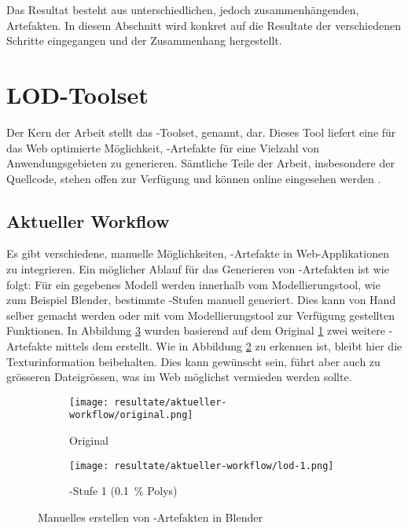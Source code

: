 Das Resultat besteht aus unterschiedlichen, jedoch zusammenhängenden, Artefakten. In diesem Abschnitt wird konkret auf die Resultate der verschiedenen Schritte eingegangen und der Zusammenhang hergestellt.

\section{LOD-Toolset}

Der Kern der Arbeit stellt das -Toolset,  genannt, dar. Dieses Tool liefert eine für das Web optimierte Möglichkeit, -Artefakte für eine Vielzahl von Anwendungsgebieten zu generieren. Sämtliche Teile der Arbeit, insbesondere der Quellcode, stehen offen zur Verfügung und können online eingesehen werden \cite{lode}.

\subsection{Aktueller Workflow}

Es gibt verschiedene, manuelle Möglichkeiten, -Artefakte in Web-Applikationen zu integrieren. Ein möglicher Ablauf für das Generieren von -Artefakten ist wie folgt:
Für ein gegebenes Modell werden innerhalb vom Modellierungstool, wie zum Beispiel Blender, bestimmte -Stufen manuell generiert. Dies kann von Hand selber gemacht werden oder mit vom Modellierungstool zur Verfügung gestellten Funktionen. In Abbildung \ref{fig:manualLodGenerationInBlender} wurden basierend auf dem Original \ref{fig:manualLodGenerationInBlenderOriginal} zwei weitere -Artefakte mittels dem  erstellt. Wie in Abbildung \ref{fig:manualLodGenerationInBlenderSimplified} zu erkennen ist, bleibt hier die Texturinformation beibehalten. Dies kann gewünscht sein, führt aber auch zu grösseren Dateigrössen, was im Web möglichst vermieden werden sollte.

\begin{figure}[H]
  \centering
  \begin{subfigure}{.45\textwidth}
    \centering
    \texttt{[image: resultate/aktueller-workflow/original.png]}
    \caption{Original}
    \label{fig:manualLodGenerationInBlenderOriginal}
  \end{subfigure}
  \begin{subfigure}{.45\textwidth}
    \centering
    \texttt{[image: resultate/aktueller-workflow/lod-1.png]}
    \caption{-Stufe 1 (0.1 \% Polys)}
    \label{fig:manualLodGenerationInBlenderSimplified}
  \end{subfigure}
  \caption{Manuelles erstellen von -Artefakten in Blender}
  \label{fig:manualLodGenerationInBlender}
\end{figure}

